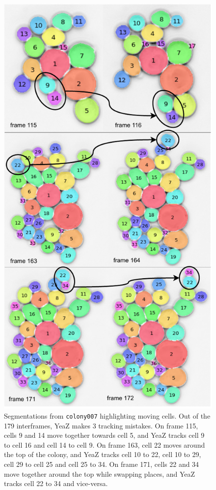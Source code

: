 \documentclass[10pt,conference,compsocconf,a4paper]{IEEEtran}
\begin{document}

\newpage



\newpage
\appendix

	\begin{figure}[h!]
		\centering
		\includegraphics[width=\linewidth]{figures/mistracks.pdf}
		\caption{Segmentations from \texttt{colony007} highlighting moving cells. Out of the 179 interframes, YeaZ makes 3 tracking mistakes. On frame 115, cells 9 and 14 move together towards cell 5, and YeaZ tracks cell 9 to cell 16 and cell 14 to cell 9. On frame 163, cell 22 moves around the top of the colony, and YeaZ tracks cell 10 to 22, cell 10 to 29, cell 29 to cell 25 and cell 25 to 34. On frame 171, cells 22 and 34 move together around the top while swapping places, and YeaZ tracks cell 22 to 34 and vice-versa.}
		\label{fig:mistracks}
	\end{figure}
\end{document}
